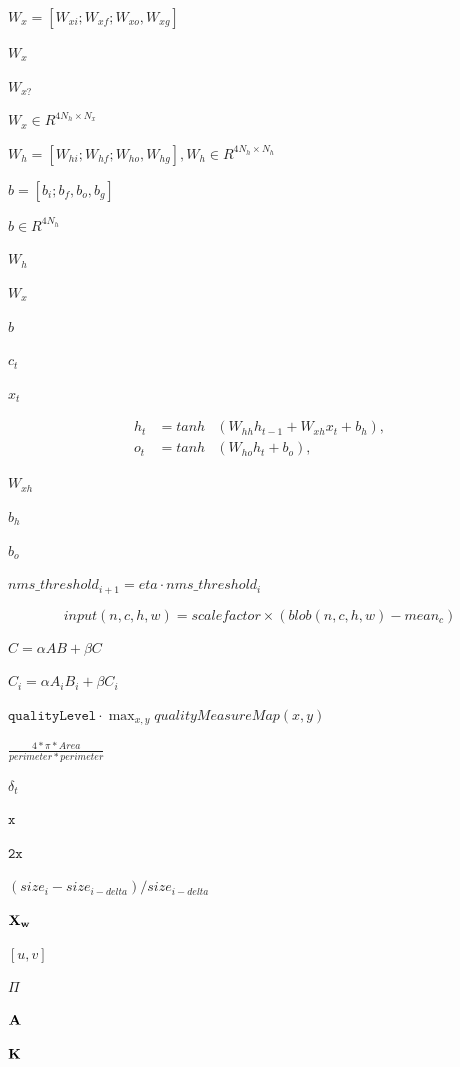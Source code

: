 \documentclass{article}
\begin{document}
$ W_x = [W_{xi}; W_{xf}; W_{xo}, W_{xg}] $
\pagebreak

$W_x$
\pagebreak

$ W_{x?} $
\pagebreak

$ W_x \in R^{4N_h \times N_x} $
\pagebreak

$ W_h = [W_{hi}; W_{hf}; W_{ho}, W_{hg}], W_h \in R^{4N_h \times N_h} $
\pagebreak

$ b = [b_i; b_f, b_o, b_g]$
\pagebreak

$b \in R^{4N_h} $
\pagebreak

$ W_h $
\pagebreak

$ W_x $
\pagebreak

$ b $
\pagebreak

$ c_t $
\pagebreak

$ x_t $
\pagebreak

\begin{eqnarray*}h_t &= tanh&(W_{hh} h_{t-1} + W_{xh} x_t + b_h),  \\
o_t &= tanh&(W_{ho} h_t + b_o),
\end{eqnarray*}
\pagebreak

$ W_{xh} $
\pagebreak

$ b_{h}  $
\pagebreak

$ b_{o}  $
\pagebreak

$nms\_threshold_{i+1}=eta\cdot nms\_threshold_i$
\pagebreak

\[input(n,c,h,w) = scalefactor \times (blob(n,c,h,w) - mean_c)\]
\pagebreak

$ C = \alpha AB + \beta C $
\pagebreak

$ C_i = \alpha A_i B_i + \beta C_i $
\pagebreak

$\texttt{qualityLevel} \cdot \max_{x,y} qualityMeasureMap(x,y)$
\pagebreak

$\frac{4*\pi*Area}{perimeter * perimeter}$
\pagebreak

$\delta_t$
\pagebreak

$\texttt{x}$
\pagebreak

$\texttt{2x}$
\pagebreak

$(size_{i}-size_{i-delta})/size_{i-delta}$
\pagebreak

$ \bf{X}_w $
\pagebreak

$ \left[ u, v \right] $
\pagebreak

$ \Pi $
\pagebreak

$ \bf{A} $
\pagebreak

$ \bf{K} $
\pagebreak
\end{document}
